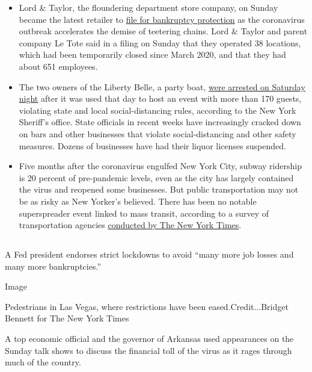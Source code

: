 \begin{itemize}
\item
  Lord \& Taylor, the floundering department store company, on Sunday
  became the latest retailer to
  \href{https://www.nytimes3xbfgragh.onion/2020/08/02/business/Lord-and-Taylor-Bankruptcy.html}{file
  for bankruptcy protection} as the coronavirus outbreak accelerates the
  demise of teetering chains. Lord \& Taylor and parent company Le Tote
  said in a filing on Sunday that they operated 38 locations, which had
  been temporarily closed since March 2020, and that they had about 651
  employees.
\item
  The two owners of the Liberty Belle, a party boat,
  \href{https://www.nytimes3xbfgragh.onion/2020/08/02/nyregion/liberty-belle-illegal-party.html}{were
  arrested on Saturday night} after it was used that day to host an
  event with more than 170 guests, violating state and local
  social-distancing rules, according to the New York Sheriff's office.
  State officials in recent weeks have increasingly cracked down on bars
  and other businesses that violate social-distancing and other safety
  measures. Dozens of businesses have had their liquor licenses
  suspended.
\item
  Five months after the coronavirus engulfed New York City, subway
  ridership is 20 percent of pre-pandemic levels, even as the city has
  largely contained the virus and reopened some businesses. But public
  transportation may not be as risky as New Yorker's believed. There has
  been no notable superspreader event linked to mass transit, according
  to a survey of transportation agencies
  \href{https://www.nytimes3xbfgragh.onion/2020/08/02/nyregion/nyc-subway-coronavirus-safety.html}{conducted
  by The New York Times}.
\end{itemize}

\hypertarget{-6}{%
\subsection{}\label{-6}}

A Fed president endorses strict lockdowns to avoid ``many more job
losses and many more bankruptcies.''

Image

Pedestrians in Las Vegas, where restrictions have been
eased.Credit...Bridget Bennett for The New York Times

A top economic official and the governor of Arkansas used appearances on
the Sunday talk shows to discuss the financial toll of the virus as it
rages through much of the country.

